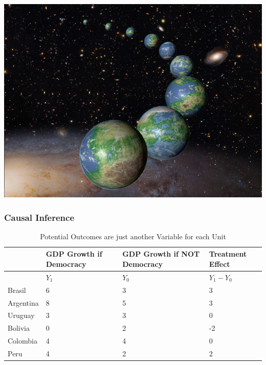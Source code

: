 \documentclass[xcolor=x11names,compress]{beamer}\usepackage[]{graphicx}\usepackage[]{color}
\renewcommand{\(}{\begin{columns}}
\renewcommand{\)}{\end{columns}}
\newcommand{\<}[1]{\begin{column}{#1}}
\renewcommand{\>}{\end{column}}
\begin{document}
\includegraphics[width=1\textwidth]{figure/Multiverse.png}

\begin{frame}
\frametitle{Causal Inference}
\footnotesize
\begin{table}[htbp]
  \centering
  \caption{Potential Outcomes are just another Variable for each Unit}
    \begin{tabular}{|p{2.4cm}|p{2.4cm}|p{2.4cm}|p{2.4cm}|}
    \hline
          & \multicolumn{1}{p{2.4cm}|}{GDP Growth if Democracy} & \multicolumn{1}{p{2.4cm}|}{GDP Growth if  NOT Democracy} &  Treatment Effect\bigstrut\\
    \hline
          & \multicolumn{1}{l|}{$Y_1$} & \multicolumn{1}{l|}{$Y_0$} & \multicolumn{1}{l|}{$Y_1-Y_0$} \bigstrut\\
    \hline
    Brasil & 6     & 3     & 3 \bigstrut\\
    \hline
    Argentina & 8    & 5     & 3 \bigstrut\\
    \hline
    Uruguay & 3 & 3 & 0  \bigstrut\\
    \hline
    Bolivia & 0     & 2     & -2 \bigstrut\\
    \hline
    Colombia & 4    & 4    & 0 \bigstrut\\
    \hline
    Peru & 4     & 2     & 2 \bigstrut\\
    \hline
    \end{tabular}%
  \label{tab:addlabel}%
\end{table}%
\normalsize
\end{frame}
\end{document}
